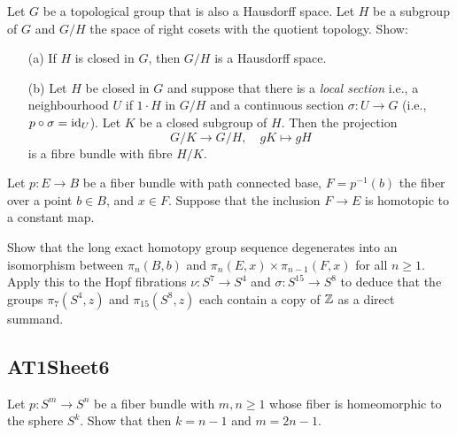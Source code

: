 \begin{sketch}
\end{sketch}

\label{exercise:AT1Sheet5.2}
Let $G$ be a topological group that is also a Hausdorff space. Let $H$ be a subgroup of $G$ and $G/H$ the space of right cosets with the quotient topology. Show:
\begin{enumerate}
    \item[(a)] If $H$ is closed in $G$, then $G/H$ is a Hausdorff space.
    \item[(b)] Let $H$ be closed in $G$ and suppose that there is a \textit{local section} i.e., a neighbourhood $U$ if $1\cdot H$ in $G/H$ and a continuous section $\sigma: U \rightarrow G$ (i.e., $p \circ \sigma = \operatorname{id}_{U}$). Let $K$ be a closed subgroup of $H$. Then the projection
    \begin{equation*}
        G/K \rightarrow G/H, \quad gK \mapsto gH
    \end{equation*}
    is a fibre bundle with fibre $H/K$.
\end{enumerate}

\begin{sketch}
\end{sketch}

\label{exercise:AT1Sheet5.3}
Let $p: E \rightarrow B$ be a fiber bundle with path connected base, $F = p^{-1}(b)$ the fiber over a point $b \in B$, and $x \in F$. Suppose that the inclusion $F \rightarrow E$ is homotopic to a constant map.

Show that the long exact homotopy group sequence degenerates into an isomorphism between $\pi_{n}(B, b)$ and $\pi_{n}(E, x) \times \pi_{n - 1}(F, x)$ for all $n \geq 1$. Apply this to the Hopf fibrations $\nu: S^{7} \rightarrow S^{4}$ and $\sigma: S^{15} \rightarrow S^{8}$ to deduce that the groups $\pi_{7}(S^{4}, z)$ and $\pi_{15}(S^{8}, z)$ each contain a copy of ${\mathbb Z}$ as a direct summand.

\begin{sketch}
\end{sketch}

\subsection{AT1Sheet6}

\label{exercise:AT1Sheet6.1}
Let $p : S^m \to S^n$ be a fiber bundle with $m,n\ge1$ whose fiber is homeomorphic to the sphere $S^k$. Show that then $k=n-1$ and $m=2n-1$.

